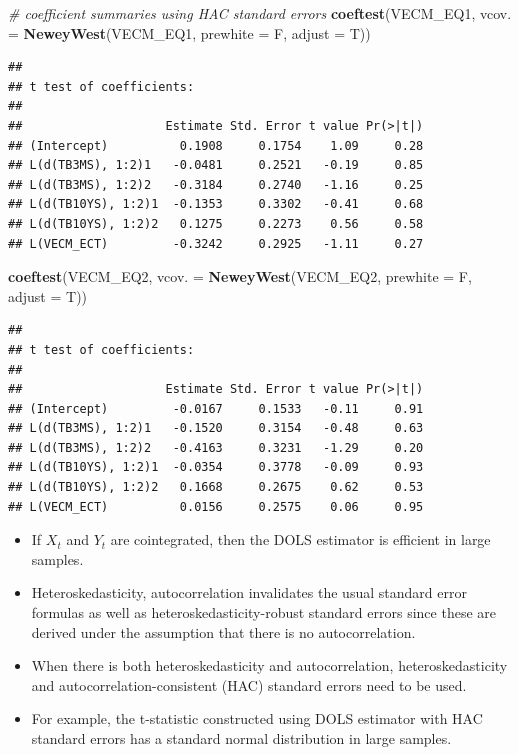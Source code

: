 \documentclass[]{book}
\newenvironment{Shaded}{\begin{snugshade}}{\end{snugshade}}
\newcommand{\CommentTok}[1]{\textcolor[rgb]{0.56,0.35,0.01}{\textit{#1}}}
\newcommand{\DataTypeTok}[1]{\textcolor[rgb]{0.13,0.29,0.53}{#1}}
\newcommand{\KeywordTok}[1]{\textcolor[rgb]{0.13,0.29,0.53}{\textbf{#1}}}
\newcommand{\NormalTok}[1]{#1}
\providecommand{\tightlist}{%
  \setlength{\itemsep}{0pt}\setlength{\parskip}{0pt}}
\begin{document}
\begin{Shaded}
\begin{Highlighting}[]
\CommentTok{# coefficient summaries using HAC standard errors}
\KeywordTok{coeftest}\NormalTok{(VECM_EQ1, }\DataTypeTok{vcov. =} \KeywordTok{NeweyWest}\NormalTok{(VECM_EQ1, }\DataTypeTok{prewhite =}\NormalTok{ F, }\DataTypeTok{adjust =}\NormalTok{ T))}
\end{Highlighting}
\end{Shaded}

\begin{verbatim}
## 
## t test of coefficients:
## 
##                    Estimate Std. Error t value Pr(>|t|)
## (Intercept)          0.1908     0.1754    1.09     0.28
## L(d(TB3MS), 1:2)1   -0.0481     0.2521   -0.19     0.85
## L(d(TB3MS), 1:2)2   -0.3184     0.2740   -1.16     0.25
## L(d(TB10YS), 1:2)1  -0.1353     0.3302   -0.41     0.68
## L(d(TB10YS), 1:2)2   0.1275     0.2273    0.56     0.58
## L(VECM_ECT)         -0.3242     0.2925   -1.11     0.27
\end{verbatim}

\begin{Shaded}
\begin{Highlighting}[]
\KeywordTok{coeftest}\NormalTok{(VECM_EQ2, }\DataTypeTok{vcov. =} \KeywordTok{NeweyWest}\NormalTok{(VECM_EQ2, }\DataTypeTok{prewhite =}\NormalTok{ F, }\DataTypeTok{adjust =}\NormalTok{ T))}
\end{Highlighting}
\end{Shaded}

\begin{verbatim}
## 
## t test of coefficients:
## 
##                    Estimate Std. Error t value Pr(>|t|)
## (Intercept)         -0.0167     0.1533   -0.11     0.91
## L(d(TB3MS), 1:2)1   -0.1520     0.3154   -0.48     0.63
## L(d(TB3MS), 1:2)2   -0.4163     0.3231   -1.29     0.20
## L(d(TB10YS), 1:2)1  -0.0354     0.3778   -0.09     0.93
## L(d(TB10YS), 1:2)2   0.1668     0.2675    0.62     0.53
## L(VECM_ECT)          0.0156     0.2575    0.06     0.95
\end{verbatim}

\begin{itemize}
\tightlist
\item
  If \(X_t\) and \(Y_t\) are cointegrated, then the DOLS estimator is efficient in large samples.
\item
  Heteroskedasticity, autocorrelation invalidates the usual standard error formulas as well as heteroskedasticity-robust standard errors since these are derived under the assumption that there is no autocorrelation.
\item
  When there is both heteroskedasticity and autocorrelation, heteroskedasticity and autocorrelation-consistent (HAC) standard errors need to be used.
\item
  For example, the t-statistic constructed using DOLS estimator with HAC standard errors has a standard normal distribution in large samples.
\end{itemize}
\end{document}
